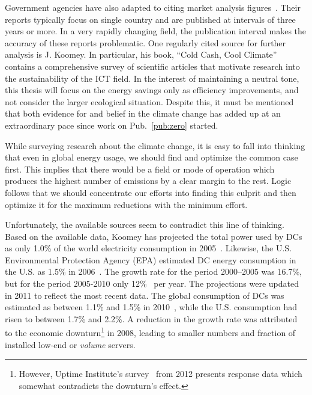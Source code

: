 \documentclass[officiallayout]{tktla}
\begin{document}
Government agencies have also adapted to citing market analysis
figures~\cite{Bailey2006,Bramfitt2012,EPA2007}. Their reports typically focus
on single country and are published at intervals of three years or more. In a
very rapidly changing field, the publication interval makes the accuracy of
these reports problematic. One regularly cited source for further analysis is
J. Koomey. In particular, his book, ``Cold Cash, Cool
Climate''~\cite{Koomey2012b} contains a comprehensive survey of scientific
articles that motivate research into the sustainability of the ICT field. In
the interest of maintaining a neutral tone, this thesis will focus on the
energy savings only as efficiency improvements, and not consider the larger
ecological situation. Despite this, it must be mentioned that both evidence
for and belief in the climate change has added up at an extraordinary pace
since work on Pub.~\ref{pub:zero} started.

While surveying research about the climate change, it is easy to fall into
thinking that even in global energy usage, we should find and optimize the
common case first. This implies that there would be a field or mode of
operation which produces the highest number of emissions by a clear margin to
the rest. Logic follows that we should concentrate our efforts into finding
this culprit and then optimize it for the maximum reductions with the minimum
effort.

Unfortunately, the available sources seem to contradict this line of thinking.
Based on the available data, Koomey has projected the total power used by DCs
as only 1.0\% of the world electricity consumption in 2005~\cite{Koomey2008}.
Likewise, the U.S. Environmental Protection Agency (EPA) estimated DC energy
consumption in the U.S. as 1.5\% in 2006~\cite{EPA2007}. The growth rate for
the period 2000--2005 was 16.7\%, but for the period 2005-2010 only
12\%~\cite{Koomey2008} per year. The projections were updated in 2011 to
reflect the most recent data. The global consumption of DCs was estimated as
between 1.1\% and 1.5\% in 2010~\cite{Koomey2011}, while the U.S. consumption
had risen to between 1.7\% and 2.2\%. A reduction in the growth rate was
attributed to the economic downturn\footnote{However, Uptime Institute's
survey~\cite{Stansberry2012} from 2012 presents response data which somewhat
contradicts the downturn's effect.} in 2008, leading to smaller numbers and
fraction of installed low-end or \emph{volume} servers.
\end{document}
